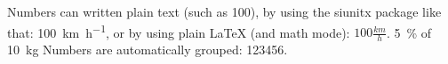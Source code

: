 \documentclass{IEEEtran}
\begin{document}
Numbers can written plain text (such as 100), by using the siunitx package like that:
\SI{100}{\km\per\hour},
or by using plain \LaTeX{} (and math mode):
$100 \frac{\mathit{km}}{h}$.
\SI{5}{\percent} of \SI{10}{kg}
Numbers are automatically grouped: \num{123456}.
\end{document}
